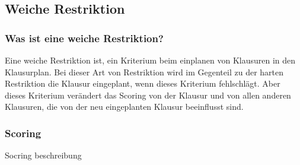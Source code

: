 \subsection{Weiche Restriktion}\label{sec:Weiche Restriktion}

\subsubsection{Was ist eine weiche Restriktion?}
Eine weiche Restriktion ist, ein Kriterium beim einplanen von Klausuren in den Klausurplan.
Bei dieser Art von Restriktion wird im Gegenteil zu der harten Restriktion die Klausur eingeplant,
wenn dieses Kriterium fehlschlägt.
Aber dieses Kriterium verändert das Scoring von der Klausur und von allen anderen Klausuren, die von
der neu eingeplanten Klausur beeinflusst sind.

\subsubsection{Scoring}
Socring beschreibung

